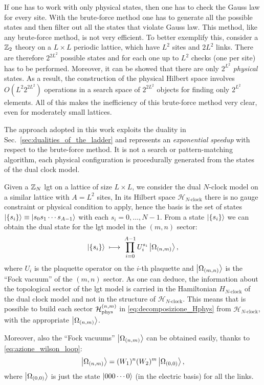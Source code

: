 If one has to work with only physical states, then one has to check the Gauss law for every site.
With the brute-force method one has to generate all the possible states and then filter out all the states that violate Gauss law.
This method, like any brute-force method, is not very efficient.
To better exemplify this, consider a $\mathbb{Z}_2$ theory on a $L \times L$ periodic lattice, which have $L^2$ sites and $2L^2$ links.
There are therefore $2^{2 L^2}$ possible states and for each one up to $L^2$ checks (one per site) has to be performed.
Moreover, it can be showed that there are only $2^{L^2}$ \emph{physical} states.
As a result, the construction of the physical Hilbert space involves $O(L^2 2^{2 L ^2})$ operations in a search space of $2^{2 L^2}$ objects for finding only $2^{L^2}$ elements.
All of this makes the inefficiency of this brute-force method very clear, even for moderately small lattices.


The approach adopted in this work exploits the duality in Sec.~\ref{sec:dualities_of_the_ladder} and represents an \emph{exponential speedup} with respect to the brute-force method.
It is not a search or pattern-matching algorithm, each physical configuration is procedurally generated from the states of the dual clock model.

Given a $\mathbb{Z}_N$ \ac{lgt} on a lattice of size $L \times L$, we consider the dual $N$-clock model on a similar lattice with $A = L^2$ sites,
In its Hilbert space $\mathcal{H}_{N\text{-clock}}$ there is no gauge constraint or physical condition to apply,
hence the basis is the set of states $\ket{ \{s_i\} } \equiv \ket{s_0 s_1 \cdots s_{A-1}}$ with each $s_i = 0, \dots, N-1$.
From a state $\ket{ \{s_i\} }$ we can obtain the dual state for the \ac{lgt} model in the $(m,n)$ sector:
\begin{equation}
    \ket{\{s_i\} } \; \longmapsto \;
    \prod_{i=0}^{A-1} U_i^{s_i} \ket{\Omega_{(n,m)}},
\end{equation}
where $U_i$ is the plaquette operator on the $i$-th plaquette and $\ket{\Omega_{(m,n)}}$ is the ``Fock vacuum'' of the $(m,n)$ sector.
As one can deduce, the information about the topological sector of the \ac{lgt} model is carried in the Hamiltonian $H_{N\text{-clock}}$ of the dual clock model and not in the structure of $\mathcal{H}_{N \text{-clock}}$.
This means that is possible to build each sector $\mathcal{H}_{\text{phys}}^{(n,m)}$ in \eqref{eq:decomposizione_Hphys} from $\mathcal{H}_{N \text{-clock}}$, with the appropriate $\ket{\Omega_{(n,m)}}$.


Moreover, also the ``Fock vacuums'' $\ket{\Omega_{(n,m)}}$ can be obtained easily, thanks to \eqref{eq:azione_wilson_loop}:
\begin{equation}
    \ket{\Omega_{(n,m)}} = (W_1)^n (W_2)^m \ket{\Omega_{(0,0)}},
\end{equation}
where $\ket{\Omega_{(0,0)}}$ is just the state $\ket{000 \cdots 0}$ (in the electric basis) for all the links.


